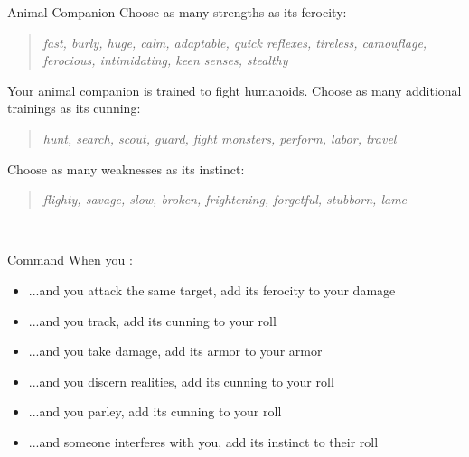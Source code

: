 \documentclass[8pt]{extarticle}
\begin{document}
\begin{minipage}[t]{4.6in}
\begin{basicmove}{Animal Companion}
  Choose as many strengths as its ferocity:

  \begin{quote}
    \textit{fast, burly, huge, calm, adaptable, quick reflexes,
      tireless, camouflage, ferocious, intimidating, keen senses,
      stealthy}
  \end{quote}

  Your animal companion is trained to fight humanoids. Choose as many
  additional trainings as its cunning:

  \begin{quote}
    \textit{hunt, search, scout, guard, fight monsters, perform,
      labor, travel}
  \end{quote}

  Choose as many weaknesses as its instinct:

  \begin{quote}
    \textit{flighty, savage, slow, broken, frightening, forgetful,
      stubborn, lame}
  \end{quote}
\end{basicmove}
\

\begin{basicmove}{Command}
  When you :

  \begin{itemize}
  \item ...and you attack the same target, add its ferocity to your damage
  \item ...and you track, add its cunning to your roll
  \item ...and you take damage, add its armor to your armor
  \item ...and you discern realities, add its cunning to your roll
  \item ...and you parley, add its cunning to your roll
  \item ...and someone interferes with you, add its instinct to their roll
  \end{itemize}
\end{basicmove}


\vfill\null
\end{minipage}
\charlower
\clearpage

\gearbanner
\end{document}
